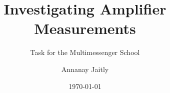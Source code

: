 \documentclass[9pt, aspectratio=169]{beamer}
\author{Annanay Jaitly}
\title{Investigating Amplifier Measurements}
\subtitle{Task for the Multimessenger School}
\date{\today}
\begin{document}
\begin{frame}
	\titlepage
\end{frame}


%
%
%
\end{document}
